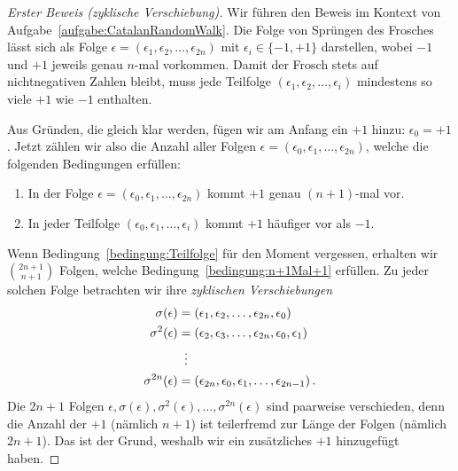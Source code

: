 \begin{proof}[Erster Beweis \textmd{(zyklische Verschiebung)}]
	Wir führen den Beweis im Kontext von Aufgabe~\ref{aufgabe:CatalanRandomWalk}. Die Folge von Sprüngen des Frosches lässt sich als Folge $\epsilon=(\epsilon_1,\epsilon_2,\dotsc,\epsilon_{2n})$ mit $\epsilon_i\in\{-1,+1\}$ darstellen, wobei $-1$ und $+1$ jeweils genau $n$-mal vorkommen. Damit der Frosch stets auf nichtnegativen Zahlen bleibt, muss jede Teilfolge $(\epsilon_1,\epsilon_2,\dotsc,\epsilon_i)$ mindestens so viele $+1$ wie $-1$ enthalten. 
	
	Aus Gründen, die gleich klar werden, fügen wir am Anfang ein $+1$ hinzu: $\epsilon_0=+1$. Jetzt zählen wir also die Anzahl aller Folgen $\epsilon=(\epsilon_0,\epsilon_1,\dotsc,\epsilon_{2n})$, welche die folgenden Bedingungen erfüllen:
	\begin{enumerate}[label={$(\Alph*)$},ref={$(\Alph*)$}]
		\item In der Folge $\epsilon=(\epsilon_0,\epsilon_1,\dotsc,\epsilon_{2n})$ kommt $+1$ genau $(n+1)$-mal vor.\label{bedingung:n+1Mal+1}
		\item In jeder Teilfolge $(\epsilon_0,\epsilon_1,\dotsc,\epsilon_i)$ kommt $+1$ häufiger vor als $-1$.\label{bedingung:Teilfolge}
	\end{enumerate}
	
	Wenn Bedingung~\ref{bedingung:Teilfolge} für den Moment vergessen, erhalten wir $\binom{2n+1}{n+1}$ Folgen, welche Bedingung~\ref{bedingung:n+1Mal+1} erfüllen. Zu jeder solchen Folge betrachten wir ihre \emph{zyklischen Verschiebungen}
	\begin{align*}
		\sigma(\epsilon)&=(\epsilon_1,\epsilon_2,\dotsc,\epsilon_{2n},\epsilon_0)\\
		\sigma^2(\epsilon)&=(\epsilon_2,\epsilon_3,\dotsc,\epsilon_{2n},\epsilon_0,\epsilon_1)\\
		&\mathrel{\tikz[inner sep=0,outer sep=0]{\node at (0,-0.5ex) {$\phantom{=}$};\node at (0,0) {$\vdots$};}}\\
		\sigma^{2n}(\epsilon)&=(\epsilon_{2n},\epsilon_0,\epsilon_1,\dotsc,\epsilon_{2n-1})\,.
	\end{align*}
	Die $2n+1$ Folgen $\epsilon,\sigma(\epsilon),\sigma^2(\epsilon),\dotsc,\sigma^{2n}(\epsilon)$ sind paarweise verschieden, denn die Anzahl der $+1$ (nämlich $n+1$) ist teilerfremd zur Länge der Folgen (nämlich $2n+1$). Das ist der Grund, weshalb wir ein zusätzliches $+1$ hinzugefügt haben.
	

\end{proof}
